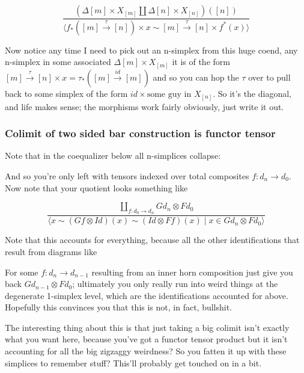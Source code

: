 \documentclass{article}
\begin{document}
\[
\frac{(\Delta[m] \times X_{[m]} \coprod \Delta[n] \times X_{[n]})([n])}{\langle f_{\ast}([m] \xrightarrow{\tau} [n]) \times x \sim [m] \xrightarrow{\tau} [n] \times f^{\ast}(x) \rangle}
\]

Now notice any time I need to pick out an n-simplex from this huge coend, any n-simplex in some associated \(\Delta[m] \times X_{[m]}\) it is of the form \([m] \xrightarrow{\tau}[n] \times x = \tau_{\ast}([m] \xrightarrow{id} [m])\) and so you can hop the \(\tau\) over to pull back to some simplex of the form \(id \times \text{some guy in }X_{[n]}\). So it's the diagonal, and life makes sense; the morphisms work fairly obviously, just write it out. 
\subsubsection{Colimit of two sided bar construction is functor tensor}
\label{sec:org6347863}
Note that in the coequalizer below all n-simplices collapse:


And so you're only left with tensors indexed over total composites \(f: d_{n} \to d_{0}\). Now note that your quotient looks something like

\[
\frac{\coprod_{f:d_{0} \to d_{n}} Gd_{n} \otimes Fd_{0}}{\langle x \sim (Gf \otimes Id)(x) \sim (Id \otimes Ff)(x) \mid x \in Gd_{n}\otimes Fd_{0}\rangle}
\]

Note that this accounts for everything, because all the other identifications that result from diagrams like 


For some \(f:d_{n} \to d_{n-1}\) resulting from an inner horn composition just give you back \(Gd_{n-1}\otimes Fd_{0}\); ultimately you only really run into weird things at the degenerate 1-simplex level, which are the identifications accounted for above. Hopefully this convinces you that this is not, in fact, bullshit.

The interesting thing about this is that just taking a big colimit isn't exactly what you want here, because you've got a functor tensor product but it isn't accounting for all the big zigzaggy weirdness? So you fatten it up with these simplices to remember stuff? This'll probably get touched on in a bit. 
\end{document}
